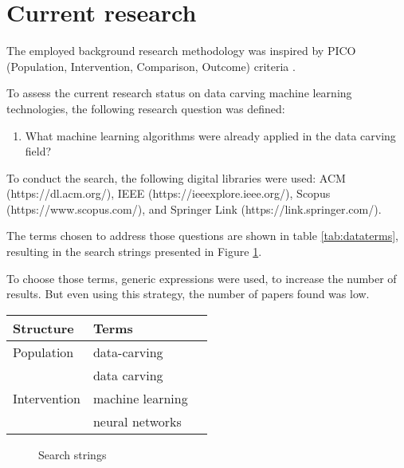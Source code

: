 \section{Current research}
The employed background research methodology was inspired by PICO (Population, Intervention, Comparison, Outcome) criteria \cite{Kitchenham07guidelinesfor}.

To assess the current research status on data carving machine learning technologies, the following research question was defined:

\begin{enumerate}[itemindent=\parindent,label=\textbf{RQ\arabic*.}]
    \item What machine learning algorithms were already applied in the data carving field?
\end{enumerate}

To conduct the search, the following digital libraries were used: 
ACM (https://dl.acm.org/),
IEEE (https://ieeexplore.ieee.org/),
Scopus (https://www.scopus.com/),
and
Springer Link (https://link.springer.com/).

The terms chosen to address those questions are shown in table \ref{tab:dataterms}, resulting in the search strings presented in  Figure \ref{fig:datasearchstring}.

To choose those terms, generic expressions were used, to increase the number of results. But even using this strategy, the number of papers found was low.


\begin{table*}[!ht]
    \centering
    \begin{tabular}{ l  l  l }
      Structure 	& Terms 		\\
      \hline\hline
      Population 	& data-carving \\   
                    & data carving \\
      \hline
      Intervention 	& machine learning \\
                    & neural networks \\
      \hline
    \end{tabular}
    \caption{Terms used}
    \label{tab:dataterms}
\end{table*}

\begin{figure}[!ht]
  \centering
  \caption{Search strings}
  \label{fig:datasearchstring}
\end{figure}


